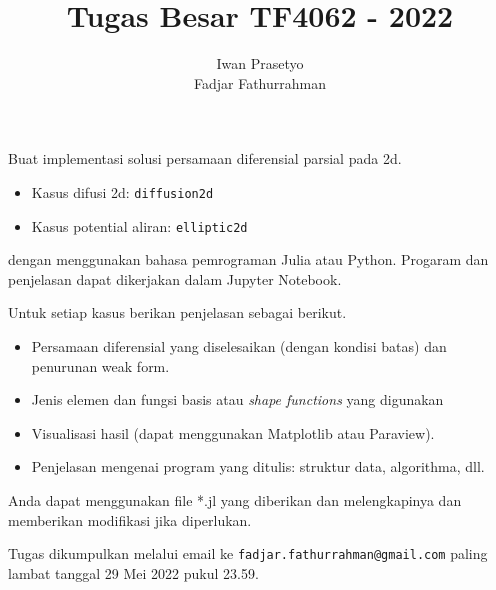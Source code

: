\documentclass[a4paper,12pt]{article} %
\newcommand{\txtinline}[1]{\texttt{#1}}
\begin{document}
\title{Tugas Besar TF4062 - 2022}
\author{Iwan Prasetyo \\
Fadjar Fathurrahman}
\date{}
\maketitle


Buat implementasi solusi persamaan diferensial parsial pada 2d.
\begin{itemize}
\item Kasus difusi 2d: \txtinline{diffusion2d}
\item Kasus potential aliran: \txtinline{elliptic2d}
\end{itemize}
dengan menggunakan bahasa pemrograman Julia atau Python.
Progaram dan penjelasan dapat dikerjakan dalam Jupyter Notebook.

Untuk setiap kasus berikan penjelasan sebagai berikut.
\begin{itemize}
\item Persamaan diferensial yang diselesaikan (dengan kondisi batas) dan penurunan
weak form.
\item Jenis elemen dan fungsi basis atau \textit{shape functions} yang digunakan
\item Visualisasi hasil (dapat menggunakan Matplotlib atau Paraview).
\item Penjelasan mengenai program yang ditulis: struktur data, algorithma, dll.
\end{itemize}

Anda dapat menggunakan file *.jl yang diberikan dan melengkapinya dan memberikan
modifikasi jika diperlukan.

Tugas dikumpulkan melalui email ke \texttt{fadjar.fathurrahman@gmail.com} paling
lambat tanggal 29 Mei 2022 pukul 23.59.
\end{document}
